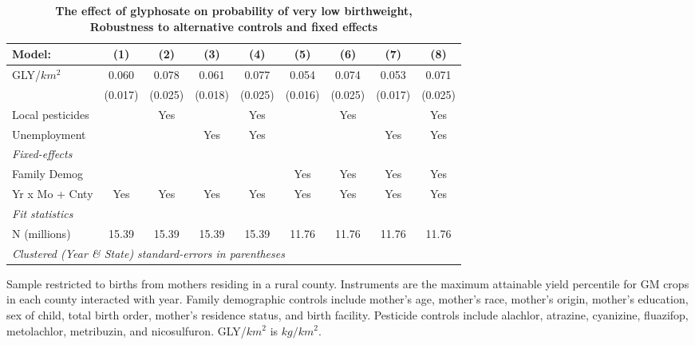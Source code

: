 \begin{table}[htbp]
   \centering
   \small
   \begin{threeparttable}[b]
      \caption{\label{tab:robust-cntrl-i_vlbw-allyielddiffpercentilegmomax} \textbf{The effect of glyphosate on probability of very low birthweight, \\ Robustness to alternative controls and fixed effects}}
      \begin{tabular}{lcccccccc}
         \toprule
         Model:           & (1)     & (2)     & (3)     & (4)     & (5)     & (6)     & (7)     & (8)\\  
         \midrule 
         GLY/$km^2$       & 0.060   & 0.078   & 0.061   & 0.077   & 0.054   & 0.074   & 0.053   & 0.071\\   
                          & (0.017) & (0.025) & (0.018) & (0.025) & (0.016) & (0.025) & (0.017) & (0.025)\\   
         Local pesticides &         & Yes     &         & Yes     &         & Yes     &         & Yes\\  
         Unemployment     &         &         & Yes     & Yes     &         &         & Yes     & Yes\\  
         \midrule
         \emph{Fixed-effects}\\
         Family Demog     &         &         &         &         & Yes     & Yes     & Yes     & Yes\\  
         Yr x Mo + Cnty   & Yes     & Yes     & Yes     & Yes     & Yes     & Yes     & Yes     & Yes\\  
         \midrule
         \emph{Fit statistics}\\
         N (millions)     & 15.39   & 15.39   & 15.39   & 15.39   & 11.76   & 11.76   & 11.76   & 11.76\\  
         \midrule
         \multicolumn{9}{l}{\emph{Clustered (Year \& State) standard-errors in parentheses}}\\
      \end{tabular}
      
      \begin{tablenotes}\item Sample restricted to births from mothers residing in a rural county. Instruments are the maximum attainable yield percentile for GM crops in each county interacted with year. Family demographic controls include mother's age, mother's race, mother's origin, mother's education, sex of child, total birth order, mother's residence status, and birth facility. Pesticide controls include alachlor, atrazine, cyanizine, fluazifop, metolachlor, metribuzin, and nicosulfuron. GLY/$km^2$ is $kg/km^2$.
      \end{tablenotes}
   \end{threeparttable}
\end{table}

